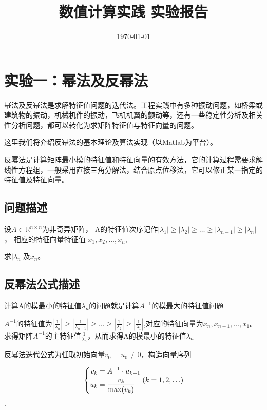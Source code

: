 \documentclass[12pt, a4paper, oneside]{ctexart}
\title{数值计算实践
	实验报告
}
\author{}
\date{\today}
\begin{document}
	
	\setcounter{page}{2} %
	\maketitle
	
	\section{实验一：幂法及反幂法}
	

	幂法及反幂法是求解特征值问题的迭代法。工程实践中有多种振动问题，如桥梁或建筑物的振动，机械机件的振动，飞机机翼的颤动等，还有一些稳定性分析及相关性分析问题，都可以转化为求矩阵特征值与特征向量的问题。
	
	这里我们将介绍反幂法的基本理论及算法实现（以Matlab为平台）。
	
	反幂法是计算矩阵最小模的特征值和特征向量的有效方法，它的计算过程需要求解线性方程组，一般采用直接三角分解法，结合原点位移法，它可以修正某一指定的特征值及特征向量。
	\subsection{问题描述}
	
	设$A \in \mathbb{R}^{n \times n}$为非奇异矩阵，
	A的特征值次序记作$\left\lvert \lambda_1 \right\rvert \geq\left\lvert \lambda_2 \right\rvert \geq \ldots \geq \left\lvert\lambda_{n-1} \right\rvert \geq \left\lvert\lambda_n \right\rvert$，
	相应的特征向量特征值 $x_1, x_2, \ldots, x_n$,
	
	求$\left\lvert\lambda_n \right\rvert$及$x_n$。
	
	\subsection{反幂法公式描述}
	计算A的模最小的特征值$\lambda_n$的问题就是计算$A^{-1}$的模最大的特征值问题
	
	$A^{-1}$的特征值为$\left\lvert \frac{1}{\lambda_n} \right\rvert \geq \left\lvert \frac{1}{\lambda_{n-1}} \right\rvert \geq \ldots \geq \left\lvert \frac{1}{\lambda_2} \right\rvert \geq \left\lvert \frac{1}{\lambda_1} \right\rvert$,对应的特征向量为$x_n, x_{n-1}, \ldots, x_1$。
	求得矩阵$A^{-1}$的主特征值$\frac{1}{\lambda_n}$，从而求得A的模最小的特征值$\lambda_n$
	
	反幂法迭代公式为任取初始向量$v_0 = u_0 \neq 0$，构造向量序列
	
	\begin{equation}
		\centering
		\left\{
		\begin{aligned}
			v_k &= A^{-1} \cdot u_{k-1} \\
			u_k &= \frac{v_k}{\max(v_k)}
		\end{aligned}
		\right. (k = 1, 2, \ldots )
	\end{equation}
	. 
	
\end{document}
